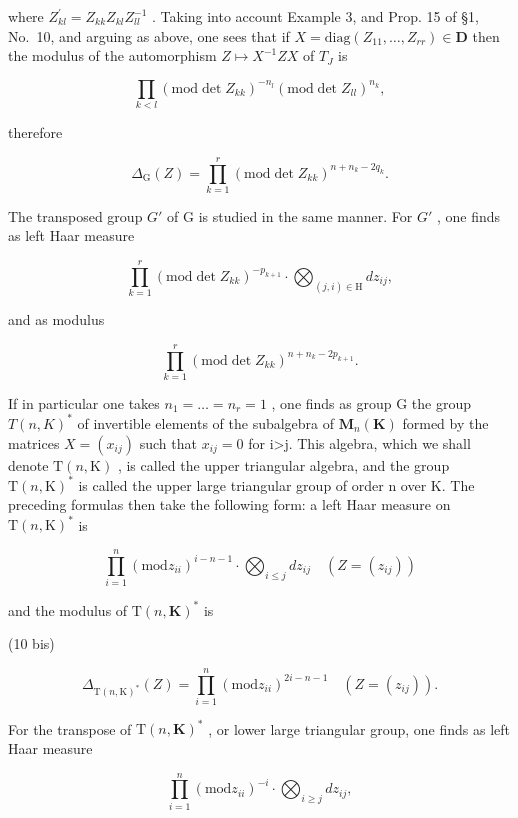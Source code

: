 where \(Z_{kl}^{\prime}=Z_{kk}Z_{kl}Z_{ll}^{-1}\) . Taking into account Example 3, and Prop. 15 of §1, No.~10, and arguing as above, one sees that if \(X=\mathrm{diag}(Z_{11},\ldots,Z_{rr})\in\mathbf{D}\) then the modulus of the automorphism \(Z\mapsto X^{-1}ZX\) of \(T_{J}\) is

\[
\prod_ {k <   l} (\mathrm{mod} \det Z _ {k k}) ^ {- n _ {l}} (\mathrm{mod} \det Z _ {l l}) ^ {n _ {k}},
\]

therefore

\[
\Delta_ {\mathrm{G}} (Z) = \prod_ {k = 1} ^ {r} (\mathrm{mod} \det Z _ {k k}) ^ {n + n _ {k} - 2 q _ {k}}.\tag{10}
\]

The transposed group \(G'\) of G is studied in the same manner. For \(G'\) , one finds as left Haar measure

\[
\prod_ {k = 1} ^ {r} (\mathrm{mod} \det Z _ {k k}) ^ {- p _ {k + 1}} \cdot \bigotimes_ {(j, i) \in \mathrm{H}} d z _ {i j},
\]

and as modulus

\[
\prod_ {k = 1} ^ {r} (\mathrm{mod} \det Z _ {k k}) ^ {n + n _ {k} - 2 p _ {k + 1}}.
\]

If in particular one takes \(n_{1}=\ldots=n_{r}=1\) , one finds as group G the group \(T(n,K)^{*}\) of invertible elements of the subalgebra of \(\mathbf{M}_{n}(\mathbf{K})\) formed by the matrices \(X=(x_{ij})\) such that \(x_{ij}=0\) for i\textgreater j. This algebra, which we shall denote \(\mathrm{T}(n,\mathrm{K})\) , is called the upper triangular algebra, and the group \(\mathrm{T}(n,\mathrm{K})^{*}\) is called the upper large triangular group of order n over K. The preceding formulas then take the following form: a left Haar measure on \(\mathrm{T}(n,\mathrm{K})^{*}\) is

\[
\prod_ {i = 1} ^ {n} (\mathrm{mod} z _ {i i}) ^ {i - n - 1} \cdot \bigotimes_ {i \leqslant j} d z _ {i j} \quad (Z = (z _ {i j}))\tag{9 bis}
\]

and the modulus of \(\mathrm{T}(n,\mathbf{K})^*\) is

(10 bis)

\[
\Delta_ {\mathrm{T} (n, \mathrm{K}) ^ {*}} (Z) = \prod_ {i = 1} ^ {n} (\mathrm{mod} z _ {i i}) ^ {2 i - n - 1} \quad \left(Z = \left(z _ {i j}\right)\right).
\]

For the transpose of \(\mathrm{T}(n,\mathbf{K})^*\) , or lower large triangular group, one finds as left Haar measure

\[
\prod_ {i = 1} ^ {n} (\mathrm{mod} z _ {i i}) ^ {- i} \cdot \bigotimes_ {i \geqslant j} d z _ {i j},
\]

